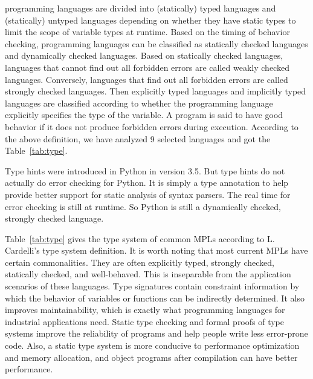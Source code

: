 

programming languages are divided into (statically) typed languages and (statically) untyped languages
depending on whether they have static types to limit the scope of variable types at runtime.
Based on the timing of behavior checking, programming languages
can be classified as statically checked languages and dynamically checked languages.
Based on statically checked languages, languages that cannot find out all forbidden
errors are called weakly checked languages.
Conversely, languages that find out all forbidden errors are called strongly checked languages.
Then explicitly typed languages and implicitly typed languages are
classified according to whether the programming language explicitly
specifies the type of the variable.
A program is said to have good behavior if it does not produce
forbidden errors during execution.
According to the above definition,
we have analyzed 9 selected languages and got the Table~\ref{tab:type}.

Type hints were introduced in Python in version 3.5.
But type hints do not actually do error checking for Python.
It is simply a type annotation to help provide better support
for static analysis of syntax parsers.
The real time for error checking is still at runtime.
So Python is still a dynamically checked, strongly checked language.

Table~\ref{tab:type} gives the type system of common MPLs according
to L. Cardelli's type system definition.
It is worth noting that most current MPLs have certain commonalities.
They are often explicitly typed, strongly checked, statically checked, and well-behaved.
This is inseparable from the application scenarios of these languages.
Type signatures contain constraint information by which the behavior of
variables or functions can be indirectly determined.
It also improves maintainability, which is exactly what programming languages
for industrial applications need.
Static type checking and formal proofs of type systems improve the reliability
of programs and help people write less error-prone code.
Also, a static type system is more conducive to performance optimization
and memory allocation, and object programs after compilation can have better performance.
